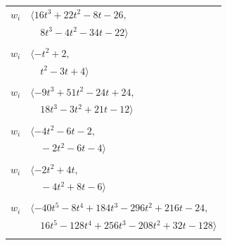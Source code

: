 \documentclass[11pt]{article}
\begin{document}
\begin{longtable}{@{}ll@{}}
$w_i$ & $\langle 16t^{3}+22t^{2}-8t-26,$\\
 & $\quad 8t^{3}-4t^{2}-34t-22\rangle$\\
\addlinespace[2pt]
\multicolumn{2}{@{}p{0.97\textwidth}@{}}{$i=33$, $D_i=1$, $\rho_{ij}$: $12{:}1, \allowbreak 27{:}1, \allowbreak 37{:}2, \allowbreak 43{:}1$}\\
$w_i$ & $\langle -t^{2}+2,$\\
 & $\quad t^{2}-3t+4\rangle$\\
\addlinespace[2pt]
\multicolumn{2}{@{}p{0.97\textwidth}@{}}{$i=34$, $D_i=1$, $\rho_{ij}$: $5{:}1, \allowbreak 7{:}2, \allowbreak 9{:}1, \allowbreak 13{:}1, \allowbreak 14{:}1, \allowbreak 15{:}1, \allowbreak 19{:}1, \allowbreak 21{:}1, \allowbreak 22{:}1, \allowbreak 25{:}2, \allowbreak 27{:}2, \allowbreak 36{:}2, \allowbreak 37{:}2, \allowbreak 40{:}1$}\\
$w_i$ & $\langle -9t^{3}+51t^{2}-24t+24,$\\
 & $\quad 18t^{3}-3t^{2}+21t-12\rangle$\\
\addlinespace[2pt]
\multicolumn{2}{@{}p{0.97\textwidth}@{}}{$i=35$, $D_i=1$, $\rho_{ij}$: $2{:}2, \allowbreak 32{:}2, \allowbreak 37{:}1, \allowbreak 40{:}1$}\\
$w_i$ & $\langle -4t^{2}-6t-2,$\\
 & $\quad -2t^{2}-6t-4\rangle$\\
\addlinespace[2pt]
\multicolumn{2}{@{}p{0.97\textwidth}@{}}{$i=36$, $D_i=1$, $\rho_{ij}$: $12{:}1, \allowbreak 13{:}2, \allowbreak 16{:}1, \allowbreak 34{:}1, \allowbreak 39{:}1$}\\
$w_i$ & $\langle -2t^{2}+4t,$\\
 & $\quad -4t^{2}+8t-6\rangle$\\
\addlinespace[2pt]
\multicolumn{2}{@{}p{0.97\textwidth}@{}}{$i=37$, $D_i=1$, $\rho_{ij}$: $1{:}1, \allowbreak 2{:}2, \allowbreak 4{:}2, \allowbreak 7{:}1, \allowbreak 9{:}1, \allowbreak 10{:}2, \allowbreak 24{:}2, \allowbreak 25{:}2, \allowbreak 26{:}2, \allowbreak 30{:}2, \allowbreak 32{:}1, \allowbreak 33{:}1, \allowbreak 34{:}1, \allowbreak 35{:}2$}\\
$w_i$ & $\langle -40t^{5}-8t^{4}+184t^{3}-296t^{2}+216t-24,$\\
 & $\quad 16t^{5}-128t^{4}+256t^{3}-208t^{2}+32t-128\rangle$\\
\addlinespace[2pt]
\multicolumn{2}{@{}p{0.97\textwidth}@{}}{$i=38$, $D_i=1$, $\rho_{ij}$: $1{:}2, \allowbreak 2{:}2, \allowbreak 3{:}2, \allowbreak 43{:}2, \allowbreak 44{:}1$}\\

\end{longtable}
\end{document}
